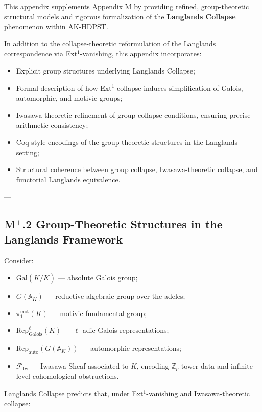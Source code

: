 \documentclass[11pt]{article}
\begin{document}
This appendix supplements Appendix M by providing refined, group-theoretic structural models and rigorous formalization of the \textbf{Langlands Collapse} phenomenon within AK-HDPST.

In addition to the collapse-theoretic reformulation of the Langlands correspondence via Ext$^1$-vanishing, this appendix incorporates:

\begin{itemize}
    \item Explicit group structures underlying Langlands Collapse;
    \item Formal description of how Ext$^1$-collapse induces simplification of Galois, automorphic, and motivic groups;
    \item Iwasawa-theoretic refinement of group collapse conditions, ensuring precise arithmetic consistency;
    \item Coq-style encodings of the group-theoretic structures in the Langlands setting;
    \item Structural coherence between group collapse, Iwasawa-theoretic collapse, and functorial Langlands equivalence.
\end{itemize}

---

\subsection*{M$^{+}$.2 Group-Theoretic Structures in the Langlands Framework}

Consider:

\begin{itemize}
    \item $\mathrm{Gal}(\overline{K}/K)$ — absolute Galois group;
    \item $G(\mathbb{A}_K)$ — reductive algebraic group over the adeles;
    \item $\pi_1^{\mathrm{mot}}(K)$ — motivic fundamental group;
    \item $\mathrm{Rep}_{\mathrm{Galois}}^\ell(K)$ — $\ell$-adic Galois representations;
    \item $\mathrm{Rep}_{\mathrm{auto}}(G(\mathbb{A}_K))$ — automorphic representations;
    \item $\mathcal{F}_{\mathrm{Iw}}$ — Iwasawa Sheaf associated to $K$, encoding $\mathbb{Z}_p$-tower data and infinite-level cohomological obstructions.
\end{itemize}

Langlands Collapse predicts that, under Ext$^1$-vanishing and Iwasawa-theoretic collapse:
\end{document}
